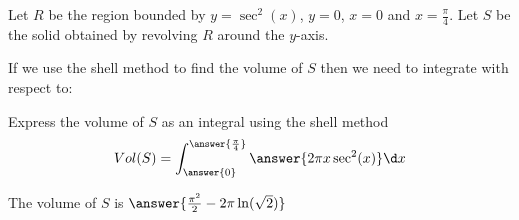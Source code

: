 \documentclass{ximera}
\author{Jason Miller}
\begin{document}
\begin{exercise}
Let $R$ be the region bounded by $y=\sec^{2}(x)$, $y=0$, $x=0$ and $x=\frac{\pi}{4}$. Let $S$ be the solid obtained by revolving $R$ around the $y$-axis. 


If we use the shell method to find the volume of $S$ then we need to integrate with respect to:

 \begin{multipleChoice}
  \end{multipleChoice}

\begin{exercise}
Express the volume of $S$ as an integral using the shell method
\[
Vol(S)=\int_{\answer{0}}^{\answer{\frac{\pi}{4}}} \answer{2\pi x \sec^{2}(x)} \d x
\]

The volume of $S$ is $\answer{  \frac{\pi^2}{2}-2\pi\ln(\sqrt{2}) }$


\end{exercise}
\end{exercise}
\end{document}
